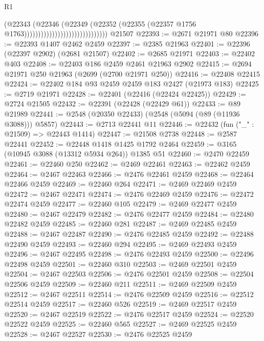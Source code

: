 \begin{lexlean}{R1}
\begin{coremodule}
                                                    (@22343
                                                      (@22346
                                                        (@22349
                                                          (@22352
                                                            (@22355
                                                              (@22357
                                                                @1756
                                                                @1763))))))))))))))))))))))))))))))
    @21507
@22393 := @2671 @21971 @80
@22396 := @22393 @1407 @2462 @2459
@22397 := @2385 @21963
@22401 := @22396 (@22397 @2902) (@2681 @21507)
@22402 := @2685 @21971
@22403 := @22402 @403
@22408 := @22403 @186 @2459 @2461 @21963 @2902
@22415 := @2694 @21971 @250 @21963 (@2699 (@2700 @21971 @250))
@22416 := @22408 @22415
@22424 := @22402 @184 @93 @2459 @2459 @183 @2427 (@21973 @183)
@22425 := @2719 @21971
@22428 := @22401 (@22416 (@22424 @22425))
@22429 := @2724 @21505
@22432 := @22391 (@22428 (@22429 @61))
@22433 := @89 @21989
@22441 := @2548 (@20350 @22433) (@2548 (@5094 (@89 (@11936 @3088))) @5857)
@22443 := @2713 @22441 @11
@22446 := @22432 (fun ("_" : @21509) => @22443 @1414)
@22447 := @21508 @2738
@22448 := @2587 @22441
@22452 := @22448 @1418 @1425 @1792 @2464
@22459 := @3165 (@10945 @3088 (@13312 @5934 @264)) @1385 @51
@22460 := @2470 @22459
@22461 := @22460 @250
@22462 := @2469 @22461
@22463 := @22462 @2459
@22464 := @2467 @22463
@22466 := @2476 @22461 @2459
@22468 := @22464 @22466 @2459
@22469 := @22460 @264
@22471 := @2469 @22469 @2459
@22472 := @2467 @22471
@22474 := @2476 @22469 @2459
@22476 := @22472 @22474 @2459
@22477 := @22460 @105
@22479 := @2469 @22477 @2459
@22480 := @2467 @22479
@22482 := @2476 @22477 @2459
@22484 := @22480 @22482 @2459
@22485 := @22460 @281
@22487 := @2469 @22485 @2459
@22488 := @2467 @22487
@22490 := @2476 @22485 @2459
@22492 := @22488 @22490 @2459
@22493 := @22460 @294
@22495 := @2469 @22493 @2459
@22496 := @2467 @22495
@22498 := @2476 @22493 @2459
@22500 := @22496 @22498 @2459
@22501 := @22460 @310
@22503 := @2469 @22501 @2459
@22504 := @2467 @22503
@22506 := @2476 @22501 @2459
@22508 := @22504 @22506 @2459
@22509 := @22460 @211
@22511 := @2469 @22509 @2459
@22512 := @2467 @22511
@22514 := @2476 @22509 @2459
@22516 := @22512 @22514 @2459
@22517 := @22460 @526
@22519 := @2469 @22517 @2459
@22520 := @2467 @22519
@22522 := @2476 @22517 @2459
@22524 := @22520 @22522 @2459
@22525 := @22460 @565
@22527 := @2469 @22525 @2459
@22528 := @2467 @22527
@22530 := @2476 @22525 @2459

\end{coremodule}
\end{lexlean}
